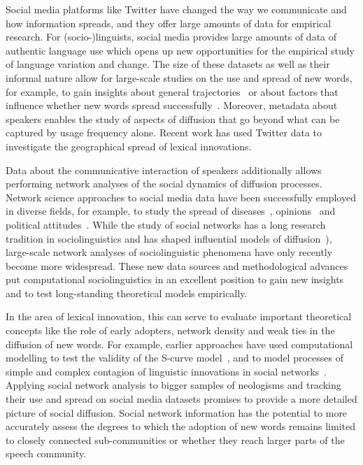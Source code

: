 \documentclass[
  a4paper,
  abstract=on,
  captions=tableabove,
  ]{scrartcl}
\begin{document}
  Social media platforms like Twitter have changed the way we communicate and how information spreads, and they offer large amounts of data for empirical research. For (socio-)linguists, social media provides large amounts of data of authentic language use which opens up new opportunities for the empirical study of language variation and change. The size of these datasets as well as their informal nature allow for large-scale studies on the use and spread of new words, for example, to gain insights about general trajectories~\parencite{Nini2017ApplicationGrowth} or about factors that influence whether new words spread successfully~\parencite{Grieve2018NaturalSelection}. Moreover, metadata about speakers enables the study of aspects of diffusion that go beyond what can be captured by usage frequency alone. Recent work has used Twitter data to investigate the geographical spread of lexical innovations.~\parencite{Eisenstein2014DiffusionLexical,Grieve2018MappingLexical}

  Data about the communicative interaction of speakers additionally allows performing network analyses of the social dynamics of diffusion processes. Network science approaches to social media data have been successfully employed in diverse fields, for example, to study the spread of diseases~\parencite{Lu2018AccurateInfluenza}, opinions~\parencite{West2014ExploitingSocial} and political attitudes~\parencite{PewResearchCenter2019NationalPolitics}. While the study of social networks has a long research tradition in sociolinguistics and has shaped influential models of diffusion~\parencite[e.g.][]{Milroy1985LinguisticChange}), large-scale network analyses of sociolinguistic phenomena have only recently become more widespread. These new data sources and methodological advances put computational sociolinguistics in an excellent position to gain new insights and to test long-standing theoretical models empirically.

  In the area of lexical innovation, this can serve to evaluate important theoretical concepts like the role of early adopters, network density and weak ties in the diffusion of new words. For example, earlier approaches have used computational modelling to test the validity of the S-curve model~\parencite{Blythe2012ScurvesMechanisms}, and to model processes of simple and complex contagion of linguistic innovations in social networks~\parencite{Goel2016SocialDynamics}. Applying social network analysis to bigger samples of neologisms and tracking their use and spread on social media datasets promises to provide a more detailed picture of social diffusion. Social network information has the potential to more accurately assess the degrees to which the adoption of new words remains limited to closely connected sub-communities or whether they reach larger parts of the speech community.
\end{document}
